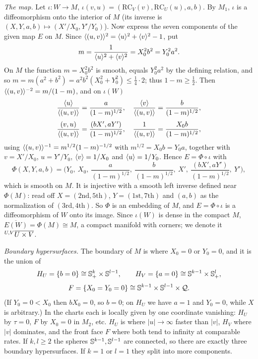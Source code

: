 \emph{The map.} Let $\iota\colon W\to M$, $\iota(v,u)=(\mathrm{RC}_V(v),\mathrm{RC}_U(u),a,b)$.
By $M_1$, $\iota$ is a diffeomorphism onto the interior of $M$ (its inverse is
$(X,Y,a,b)\mapsto(X'/X_0,Y'/Y_0)$). Now express the seven components of the given map
$E$ on $M$. Since $\langle (u,v)\rangle^2=\langle u\rangle^2+\langle v\rangle^2-1$, put
\[
  m=\frac1{\langle u\rangle^2+\langle v\rangle^2}=X_0^2b^2=Y_0^2a^2 .
\]
On $M$ the function $m=X_0^2b^2$ is smooth, equals $Y_0^2a^2$ by the defining
relation, and so $m=m(a^2+b^2)=a^2b^2(X_0^2+Y_0^2)\le\frac14\cdot2$; thus $1-m\ge\frac12$.
Then $\langle (u,v)\rangle^{-2}=m/(1-m)$, and on $\iota(W)$
\[
  \frac{\langle u\rangle}{\langle (u,v)\rangle}=\frac{a}{(1-m)^{1/2}},\quad
  \frac{\langle v\rangle}{\langle (u,v)\rangle}=\frac{b}{(1-m)^{1/2}},
\]
\[
  \frac{(v,u)}{\langle (u,v)\rangle}=\frac{(bX',aY')}{(1-m)^{1/2}},\quad
  \frac1{\langle (u,v)\rangle}=\frac{X_0b}{(1-m)^{1/2}},
\]
using $\langle (u,v)\rangle^{-1}=m^{1/2}(1-m)^{-1/2}$ with $m^{1/2}=X_0b=Y_0a$, together with
$v=X'/X_0$, $u=Y'/Y_0$, $\langle v\rangle=1/X_0$ and $\langle u\rangle=1/Y_0$. Hence $E=\Phi\circ\iota$ with
\[
  \Phi(X,Y,a,b)=\Big(Y_0,\ X_0,\ \frac{a}{(1-m)^{1/2}},\ \frac{b}{(1-m)^{1/2}},\ X',\
  \frac{(bX',aY')}{(1-m)^{1/2}},\ Y'\Big),
\]
which is smooth on $M$. It is injective with a smooth left inverse defined near
$\Phi(M)$: read off $X=(\text{2nd},\text{5th})$, $Y=(\text{1st},\text{7th})$ and $(a,b)$ as
the normalization of $(\text{3rd},\text{4th})$. So $\Phi$ is an embedding of $M$, and
$E=\Phi\circ\iota$ is a diffeomorphism of $W$ onto its image. Since $\iota(W)$ is dense
in the compact $M$, $\overline{E(W)}=\Phi(M)\cong M$, a compact manifold with corners;
we denote it ${}^{U,V}\overline{U\times V}$.

\emph{Boundary hypersurfaces.} The boundary of $M$ is where $X_0=0$ or $Y_0=0$, and it is
the union of
\[
  H_U=\{b=0\}\cong\mathbb{S}^k_+\times\mathbb{S}^{l-1},\qquad
  H_V=\{a=0\}\cong\mathbb{S}^{k-1}\times\mathbb{S}^l_+,
\]
\[
  F=\{X_0=Y_0=0\}\cong\mathbb{S}^{k-1}\times\mathbb{S}^{l-1}\times\mathcal{Q}.
\]
(If $Y_0=0<X_0$ then $bX_0=0$, so $b=0$; on $H_U$ we have $a=1$ and $Y_0=0$, while $X$ is
arbitrary.) In the charts each is locally given by one coordinate vanishing: $H_U$ by
$\tau=0$, $F$ by $X_0=0$ in $M_2$, etc. $H_U$ is where $|u|\to\infty$ faster than $|v|$,
$H_V$ where $|v|$ dominates, and the front face $F$ where both tend to infinity at
comparable rates. If $k,l\ge2$ the spheres $\mathbb{S}^{k-1},\mathbb{S}^{l-1}$ are connected, so
there are exactly three boundary hypersurfaces. If $k=1$ or $l=1$ they split into more
components.

